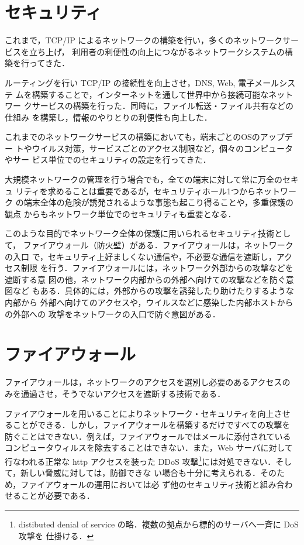 \section{セキュリティ}
これまで，TCP/IP によるネットワークの構築を行い，多くのネットワークサービスを立ち上げ，
利用者の利便性の向上につながるネットワークシステムの構築を行ってきた．

ルーティングを行い TCP/IP の接続性を向上させ，DNS, Web, 電子メールシステ
ムを構築することで，インターネットを通して世界中から接続可能なネットワー
クサービスの構築を行った．同時に，ファイル転送・ファイル共有などの仕組み
を構築し，情報のやりとりの利便性も向上した．

これまでのネットワークサービスの構築においても，端末ごとのOSのアップデー
トやウイルス対策，サービスごとのアクセス制限など，個々のコンピュータやサー
ビス単位でのセキュリティの設定を行ってきた．

大規模ネットワークの管理を行う場合でも，全ての端末に対して常に万全のセキュ
リティを求めることは重要であるが，セキュリティホール1つからネットワーク
の端末全体の危険が誘発されるような事態も起こり得ることや，多重保護の観点
からもネットワーク単位でのセキュリティも重要となる．

このような目的でネットワーク全体の保護に用いられるセキュリティ技術として，
ファイアウォール（防火壁）がある．ファイアウォールは，ネットワークの入口
で，セキュリティ上好ましくない通信や，不必要な通信を遮断し，アクセス制限
を行う．ファイアウォールには，ネットワーク外部からの攻撃などを遮断する意
図の他，ネットワーク内部からの外部へ向けての攻撃などを防ぐ意図など
もある．具体的には，外部からの攻撃を誘発したり助けたりするような内部から
外部へ向けてのアクセスや，ウイルスなどに感染した内部ホストからの外部への
攻撃をネットワークの入口で防ぐ意図がある．

\section{ファイアウォール}
ファイアウォールは，ネットワークのアクセスを選別し必要のあるアクセスの
みを通過させ，そうでないアクセスを遮断する技術である．

ファイアウォールを用いることによりネットワーク・セキュリティを向上させ
ることができる．しかし，ファイアウォールを構築するだけですべての攻撃を
防ぐことはできない．例えば，ファイアウォールではメールに添付されている
コンピュータウィルスを除去することはできない．また，Web サーバに対して
行なわれる正常な http アクセスを装った DDoS 攻撃\footnote{distibuted
  denial of service の略．複数の拠点から標的のサーバへ一斉に DoS 攻撃を
  仕掛ける．}には対処できない．そして，新しい脅威に対しては，防御できな
い場合も十分に考えられる．そのため，ファイアウォールの運用においては必
ず他のセキュリティ技術と組み合わせることが必要である．

